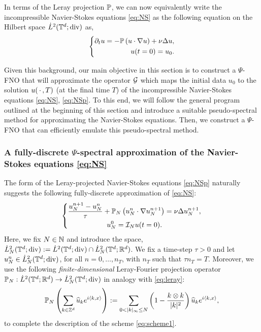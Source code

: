 \documentclass[reqno,a4paper]{amsart}
\begin{document}
In terms of the Leray projection $\P$, we can now equivalently write the incompressible Navier-Stokes equations \eqref{eq:NS} as the following equation on the Hilbert space  $\dot{L}^2(\T^d;\div)$ as, 
\begin{align} \label{eq:NSp}
\left\{
\begin{aligned}
\partial_t u = -\P\left( u\cdot \nabla u \right) + \nu \Delta u, \\
u(t=0) = u_0.
\end{aligned}
\right.
\end{align}

Given this background, our main objective in this section is to construct a $\Psi$-FNO that will approximate the operator $\G$ which maps the initial data $u_0$ to the solution $u(\slot,T)$ (at the final time $T$) of the incompressible Navier-Stokes equations \eqref{eq:NS}, \eqref{eq:NSp}. To this end, we will follow the general program outlined at the beginning of this section and introduce a suitable pseudo-spectral method for approximating the Navier-Stokes equations. Then, we construct a $\Psi$-FNO that can efficiently emulate this pseudo-spectral method. 
\subsubsection{A fully-discrete $\Psi$-spectral approximation of the Navier-Stokes equations \eqref{eq:NS}}
The form of the Leray-projected Navier-Stokes equations \eqref{eq:NSp} naturally suggests the following fully-discrete approximation of \eqref{eq:NS}:
\begin{align} \label{eq:scheme1}
\left\{
\begin{gathered}
\frac{u_N^{n+1} - u_N^n}{\dt} 
+ \P_N \left(
u^n_N \cdot \nabla u^{n+1}_N
\right)
=
\nu \Delta u_N^{n+1}, 
\\
u^0_N = \cI_Nu(t=0).
\end{gathered}
\right.
\end{align}
Here, we fix $N\in \N$ and introduce the space, $\dot{L}^2_N(\T^d;\div) := \dot{L}^2(\T^d;\div)\cap \dot{L}^2_N(\T^d;\R^d)$. We fix a time-step $\tau > 0$ and let $u^n_N \in \dot{L}^2_N(\T^d;\div)$, for all $n=0,\ldots,n_T$, with $n_T$ such that $\tau n_T = T$. Moreover, we use the following \emph{finite-dimensional} Leray-Fourier projection operator $\P_N: \dot{L}^2(\T^d;\R^d) \to \dot{L}^2_N(\T^d;\div)$ in analogy with \eqref{eq:leray}:
\begin{align} \label{eq:lerayn}
\P_N\left(
\sum_{k\in \Z^d} \hat{u}_k e^{i\langle k, x\rangle}
\right)
:=
\sum_{0<|k|_\infty\le N}
\left(
1 - \frac{k\otimes k}{|k|^2}
\right) \hat{u}_k e^{i\langle k, x\rangle},
\end{align}
to complete the description of the scheme \eqref{eq:scheme1}. 
\end{document}

